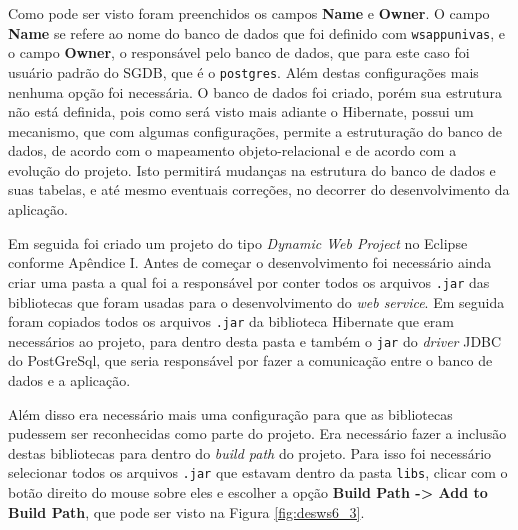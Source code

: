 	\par Como pode ser visto foram preenchidos os campos \textbf{Name} e
\textbf{Owner}. O campo \textbf{Name} se refere ao nome do banco de dados que
foi definido com \texttt{wsappunivas}, e o campo \textbf{Owner}, o responsável
pelo banco de dados, que para este caso foi usuário padrão do SGDB, que é o
\texttt{postgres}. Além destas configurações mais nenhuma opção foi necessária.
O banco de dados foi criado, porém sua estrutura não está definida, pois como
será visto mais adiante o Hibernate, possui um mecanismo, que com algumas
configurações, permite a estruturação do banco de dados, de acordo com o
mapeamento objeto-relacional e de acordo com a evolução do projeto. Isto
permitirá mudanças na estrutura do banco de dados e suas tabelas, e até mesmo
eventuais correções, no decorrer do desenvolvimento da aplicação.
	
	\par Em seguida foi criado um projeto do tipo \textit{Dynamic Web Project} no
Eclipse conforme Apêndice I. Antes de começar o desenvolvimento foi necessário
ainda criar uma pasta a qual foi a responsável por conter todos os arquivos
\texttt{.jar} das bibliotecas que foram usadas para o desenvolvimento do
\textit{web service}. Em seguida foram copiados todos os arquivos \texttt{.jar}
da biblioteca Hibernate que eram necessários ao projeto, para dentro desta
pasta e também o \texttt{jar} do \textit{driver} JDBC do PostGreSql, que seria
responsável por fazer a comunicação entre o banco de dados e a aplicação.
	
	\par Além disso era necessário mais uma configuração para que as bibliotecas
pudessem ser reconhecidas como parte do projeto. Era necessário fazer a
inclusão destas bibliotecas para dentro do \textit{build path} do projeto. Para
isso foi necessário selecionar todos os arquivos \texttt{.jar} que estavam
dentro da pasta \texttt{libs}, clicar com o botão direito do mouse sobre eles e
escolher a opção \textbf{Build Path -> Add to Build Path}, que pode ser visto
na Figura \ref{fig:desws6_3}.

